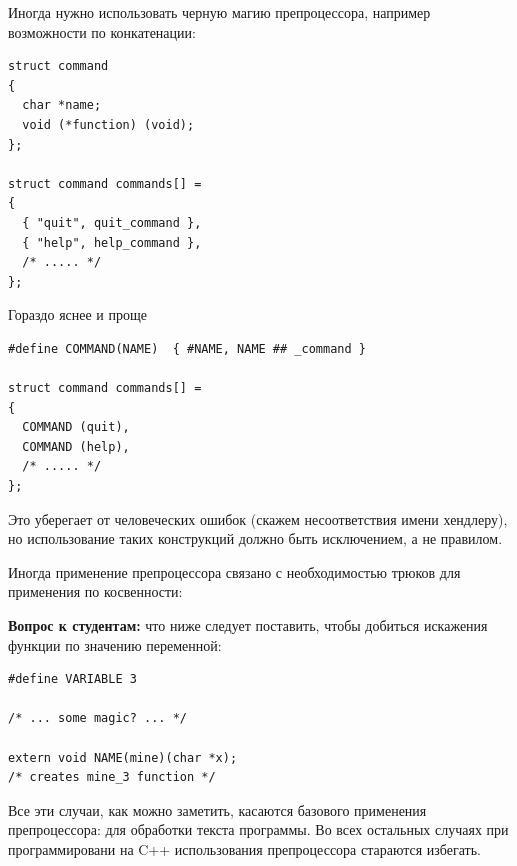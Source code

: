 \documentclass[a4paper,12pt,oneside]{article}
\newif\ifanswers
\begin{document}
Иногда нужно использовать черную магию препроцессора, например возможности по конкатенации:

\begin{lstlisting}
struct command
{
  char *name;
  void (*function) (void);
};
     
struct command commands[] =
{
  { "quit", quit_command },
  { "help", help_command },
  /* ..... */
};
\end{lstlisting}

Гораздо яснее и проще

\begin{lstlisting}
#define COMMAND(NAME)  { #NAME, NAME ## _command }
     
struct command commands[] =
{
  COMMAND (quit),
  COMMAND (help),
  /* ..... */
};
\end{lstlisting}

Это уберегает от человеческих ошибок (скажем несоответствия имени хендлеру), но использование таких конструкций должно быть исключением, а не правилом.

Иногда применение препроцессора связано с необходимостью трюков для применения по косвенности:

\textbf{Вопрос к студентам:} что ниже следует поставить, чтобы добиться искажения функции по значению переменной:

\begin{lstlisting}
#define VARIABLE 3

/* ... some magic? ... */

extern void NAME(mine)(char *x);
/* creates mine_3 function */
\end{lstlisting}

\ifanswers
Правильный ответ должен включать не менее трёх уровней косвенности:

\begin{lstlisting}
#define PASTER(x,y) x ## _ ## y
#define EVALUATOR(x,y)  PASTER(x,y)
#define NAME(fun) EVALUATOR(fun, VARIABLE)
\end{lstlisting}

Порядок расширения макросов следующий:

\begin{lstlisting}
NAME(mine)
EVALUATOR(mine, VARIABLE)
PASTER(mine, 3)
\end{lstlisting}

Поэтому пропустить хотя бы один уровень косвенности здесь нельзя.
\fi

Все эти случаи, как можно заметить, касаются базового применения препроцессора: для обработки текста программы. Во всех остальных случаях при программировани на C++ использования препроцессора стараются избегать.
\end{document}

